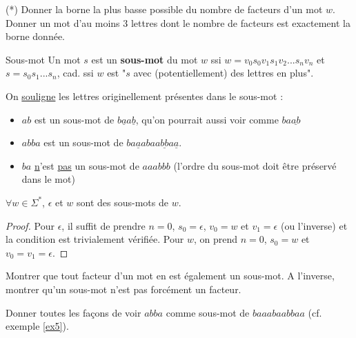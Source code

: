 \begin{exercice} \label{exfact}(*)
Donner la borne la plus basse possible du nombre de facteurs d'un mot $w$. Donner un mot d'au moins 3 lettres dont le nombre de facteurs est exactement la borne donnée.
\end{exercice}

\begin{definition}{Sous-mot}{}
Un mot $s$ est un \textbf{sous-mot} du mot $w$ ssi $w = v_0s_0v_1s_1v_2...s_nv_n$ et $s = s_0s_1...s_n$, cad. ssi $w$ est "$s$ avec (potentiellement) des lettres en plus".
\end{definition}

\begin{example}\label{ex5} On \underline{souligne} les lettres originellement présentes dans le sous-mot :
\begin{itemize}
   \item $ab$ est un sous-mot de $b\underline{a}a\underline{b}$, qu'on pourrait aussi voir comme $ba\underline{ab}$
   \item $abba$ est un sous-mot de $ba\underline{a}abaa\underline{bb}a\underline{a}$.
   \item $ba$ \underline{n}'est \underline{pas} un sous-mot de $aaabbb$ (l'ordre du sous-mot doit être préservé dans le mot) 
\end{itemize}
\end{example}


\begin{lemma}
$\forall w \in \Sigma^*$, $\epsilon$ et $w$ sont des sous-mots de $w$.
\end{lemma}

\begin{proof}
Pour $\epsilon$, il suffit de prendre $n = 0$, $s_0 = \epsilon$, $v_0 = w$ et $v_1 = \epsilon$ (ou l'inverse) et la condition est trivialement vérifiée. Pour $w$, on prend $n = 0$, $s_0 = w$ et $v_0 = v_1 = \epsilon$.
\end{proof}

\begin{exercice}
Montrer que tout facteur d'un mot en est également un sous-mot. A l'inverse, montrer qu'un sous-mot n'est pas forcément un facteur. 
\end{exercice}

\begin{exercice}
Donner toutes les façons de voir $abba$ comme sous-mot de $baaabaabbaa$ (cf. exemple \ref{ex5}).
\end{exercice}

